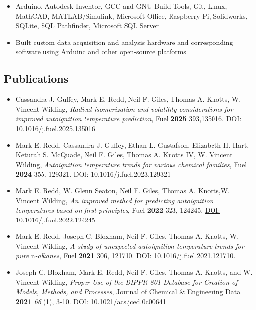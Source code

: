 \begin{itemize}
\tightlist
\item
  Arduino, Autodesk Inventor, GCC and GNU Build Tools, Git, Linux,
  MathCAD, MATLAB/Simulink, Microsoft Office, Raspberry Pi, Solidworks,
  SQLite, SQL Pathfinder, Microsoft SQL Server
\item
  Built custom data acquisition and analysis hardware and corresponding
  software using Arduino and other open-source platforms
\end{itemize}

\subsection{Publications}\label{publications}


\begin{itemize}
\item
  Cassandra J. Guffey, Mark E. Redd, Neil F. Giles, Thomas A. Knotts, W.
  Vincent Wilding, \emph{Radical isomerization and volatility
  considerations for improved autoignition temperature prediction}, Fuel
  \textbf{2025} 393,135016.
  \href{https://doi.org/10.1016/j.fuel.2025.135016}{DOI:
  10.1016/j.fuel.2025.135016}
\item
  Mark E. Redd, Cassandra J. Guffey, Ethan L. Gustafson, Elizabeth H.
  Hart, Keturah S. McQuade, Neil F. Giles, Thomas A. Knotts IV, W.
  Vincent Wilding, \emph{Autoignition temperature trends for various
  chemical families}, Fuel \textbf{2024} 355, 129321.
  \href{https://doi.org/10.1016/j.fuel.2023.129321}{DOI:
  10.1016/j.fuel.2023.129321}
\item
  Mark E. Redd, W. Glenn Seaton, Neil F. Giles, Thomas A. Knotts,W.
  Vincent Wilding, \emph{An improved method for predicting autoignition
  temperatures based on first principles}, Fuel \textbf{2022} 323,
  124245. \href{https://doi.org/10.1016/j.fuel.2022.124245}{DOI:
  10.1016/j.fuel.2022.124245}
\item
  Mark E. Redd, Joseph C. Bloxham, Neil F. Giles, Thomas A. Knotts, W.
  Vincent Wilding, \emph{A study of unexpected autoignition temperature
  trends for pure} n\emph{-alkanes}, Fuel \textbf{2021} 306, 121710.
  \href{https://doi.org/10.1016/j.fuel.2021.121710}{DOI:
  10.1016/j.fuel.2021.121710}.
\item
  Joseph C. Bloxham, Mark E. Redd, Neil F. Giles, Thomas A. Knotts, and
  W. Vincent Wilding, \emph{Proper Use of the DIPPR 801 Database for
  Creation of Models, Methods, and Processes}, Journal of Chemical \&
  Engineering Data \textbf{2021} \emph{66} (1), 3-10.
  \href{https://doi.org/10.1021/acs.jced.0c00641}{DOI:
  10.1021/acs.jced.0c00641}
\end{itemize}

